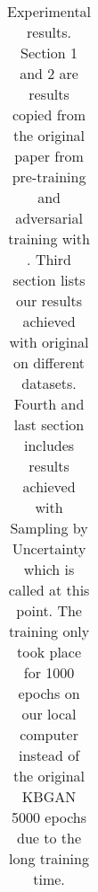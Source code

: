 \begin{table}[h]
\begin{tabular}{lllllll}
        \bottomrule
    \end{tabular}
    \caption{Experimental results.
    Section 1 and 2 are results copied from the original paper \cite{cai2017kbgan} from pre-training and adversarial training with \kbgan. 
    Third section lists our results achieved with original \kbgan on different datasets.
    Fourth and last section includes results achieved with Sampling by Uncertainty which is called \ucgan at this point.
    The training only took place for 1000 epochs on our local computer instead of the original \textsc{KBGAN} 5000 epochs due to the long training time.}
\label{tab:results}
\end{table}